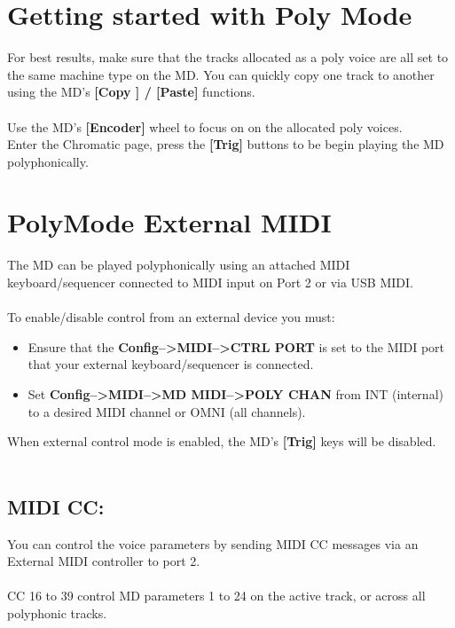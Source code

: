 \section{Getting started with Poly Mode}
For best results, make sure that the tracks allocated as a poly voice are all set to the same machine type on the MD. You can quickly copy one track to another using the MD's \textbf{[Copy ] / [Paste]} functions.\\\\
Use the MD's \textbf{[Encoder]} wheel to focus on on the allocated poly voices.\\
Enter the Chromatic page, press the \textbf{[Trig]} buttons to be begin playing the MD polyphonically.
\section{PolyMode External MIDI}
The MD can be played polyphonically using an attached MIDI keyboard/sequencer connected to MIDI input on Port 2 or via USB MIDI.\\\\
To enable/disable control from an external device you must:  
\begin{itemize}
    \item Ensure that the \textbf{Config-->MIDI-->CTRL PORT} is set to the MIDI port that your external keyboard/sequencer is connected.
    \item Set \textbf{Config-->MIDI-->MD MIDI-->POLY CHAN} from INT (internal) to a desired MIDI channel or OMNI (all channels).
\end{itemize}
When external control mode is enabled, the MD's \textbf{[Trig]} keys will be disabled.\\\\
\subsection{MIDI CC:}
You can control the voice parameters by sending MIDI CC messages via an External MIDI controller to port 2.\\\\CC 16 to 39 control MD parameters 1 to 24 on the active track, or across all polyphonic tracks.

